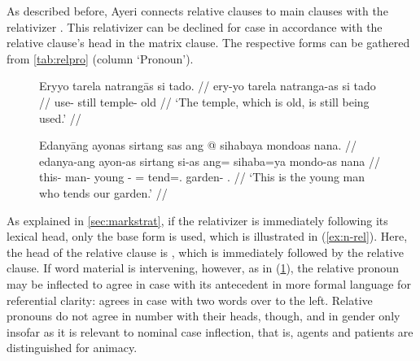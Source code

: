 
As described before, Ayeri connects relative clauses to main clauses with the
relativizer . This relativizer can be declined for case in
accordance with the relative clause's head in the matrix clause. The respective
forms can be gathered from \autoref{tab:relpro} (column `Pronoun').

\begin{figure}[h]
\pex
\a\label{ex:n-rel}\begingl
	\gla Eryyo tarela natrangās si tado. //
	\glb ery-yo tarela natranga-as si tado //
	\glc use-\TsgN{} still temple-\Parg{} \Rel{} old //
	\glft `The temple, which is old, is still being used.' //
\endgl

\a\label{ex:n-adj-rel}\begingl
	\gla Edanyāng ayonas sirtang sas ang @ sihabaya mondoas nana. //
	\glb edanya-ang ayon-as sirtang si-as ang= sihaba=ya mondo-as nana //
	\glc this-\Aarg{} man-\Parg{} young \Rel{}-\Parg{} 
		\AgtT{}= tend=\TsgM{}.\Top{} garden-\Parg{} \Fpl{}.\Gen{} //
	\glft `This is the young man who tends our garden.' //
\endgl
\xe
\end{figure}

As explained in \autoref{sec:markstrat}, if the relativizer is immediately 
following its lexical head, only the base form  is used, which is 
illustrated in (\ref{ex:n-rel}). Here, the head of the relative clause is
, which is immediately followed by the
relative clause. If word material is intervening, however, as in
(\ref{ex:n-adj-rel}), the relative pronoun may be inflected to agree in case
with its antecedent in more formal language for referential clarity:
 agrees in case with  two words over to the
left. Relative pronouns do not agree in number with their heads, though, and in
gender only insofar as it is relevant to nominal case inflection, that is,
agents and patients are distinguished for animacy.

